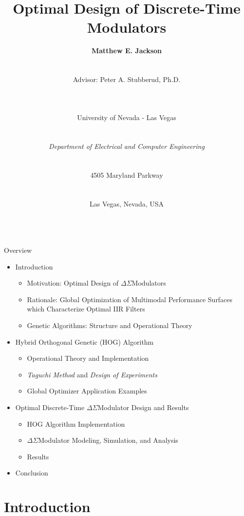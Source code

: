 \documentclass[
	style=aggie,
	mode=present,
	size=10pt,
	paper=screen,
	orient=landscape,
	display=slides,
]{powerdot}
\title{Optimal Design of Discrete-Time \DS Modulators}
\author{
\textbf{Matthew E. Jackson}\\
\\
\begin{footnotesize}Advisor: Peter A. Stubberud, Ph.D.\end{footnotesize}\\
\\
\begin{scriptsize}University of Nevada - Las Vegas\end{scriptsize}\\
\begin{scriptsize}\textit{Department of Electrical and Computer
Engineering}\end{scriptsize}\\
\begin{scriptsize}4505 Maryland Parkway\end{scriptsize}\\
\begin{scriptsize}Las Vegas, Nevada, USA\end{scriptsize}\\
}
\date{}
\newcommand{\DS}		{$\Delta\Sigma$\space}
\begin{document}
\maketitle

\begin{slide}[toc=,bm=]{Overview}
	\begin{itemize}[type=1]
		\item Introduction
  		\begin{itemize}
  			\item Motivation: Optimal Design of \DS Modulators
   			\item Rationale: Global Optimization of Multimodal Performance Surfaces 
				  which Characterize Optimal IIR Filters 
  			\item Genetic Algorithms: Structure and Operational Theory \pause
		\end{itemize}
  		\item Hybrid Orthogonal Genetic (HOG) Algorithm
  		\begin{itemize}
   			\item Operational Theory and Implementation
   			\item \textit{Taguchi Method} and \textit{Design of Experiments}
 			\item Global Optimizer Application Examples \pause
  		\end{itemize}
  		\item Optimal Discrete-Time \DS Modulator Design and Results
  		\begin{itemize}
   			\item HOG Algorithm Implementation
   			\item \DS Modulator Modeling, Simulation, and Analysis
   			\item Results \pause
  		\end{itemize}
  		\item Conclusion
	\end{itemize}
\end{slide}

\section[slide=true]{Introduction}
\end{document}
